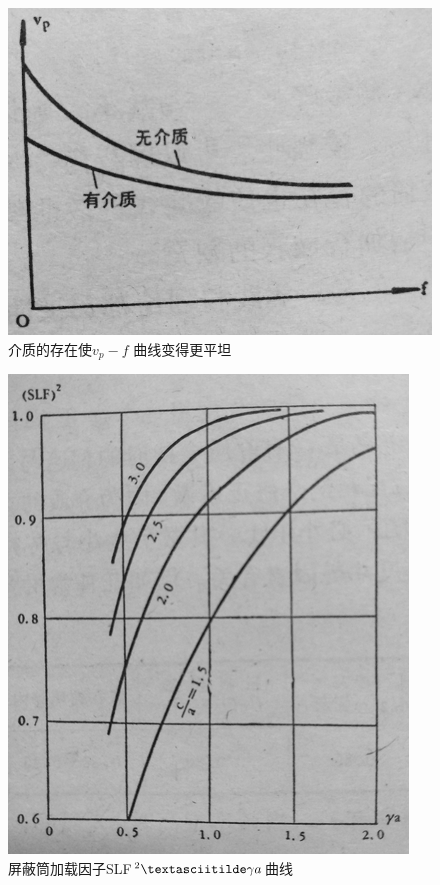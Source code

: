 \begin{figure}[phtb]
	\centering
	\includegraphics[width=0.65\linewidth]{figure/ch3-10}
	\caption{介质的存在使$ v_p-f $ 曲线变得更平坦}
	\label{ch3-10}
\end{figure}

\begin{figure}[phtb]
	\centering
	\includegraphics[width=0.65\linewidth]{figure/ch3-11}
	\caption{屏蔽筒加载因子SLF$ ^2 \textasciitilde \gamma a$曲线}
	\label{ch3-11}
\end{figure}